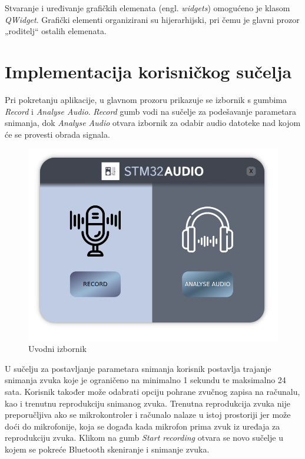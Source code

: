 Stvaranje i uređivanje grafičkih elemenata (engl. \textit{widgets}) omogućeno je klasom \textit{QWidget}. Grafički elementi organizirani su hijerarhijski, pri čemu je glavni prozor  „roditelj“ ostalih elemenata. 

\section{Implementacija korisničkog sučelja}

Pri pokretanju aplikacije, u glavnom prozoru prikazuje se izbornik s gumbima \textit{Record} i \textit{Analyse Audio}. \textit{Record} gumb vodi na sučelje za podešavanje parametara snimanja, dok \textit{Analyse Audio} otvara izbornik za odabir audio datoteke nad kojom će se provesti obrada signala.

\begin{figure}[ht]
	\includegraphics[width=\linewidth]{imgs/intro_form}
	\caption{Uvodni izbornik}
	\label{fig:intro_form}
\end{figure}


U sučelju za postavljanje parametara snimanja korisnik postavlja trajanje snimanja zvuka koje je ograničeno na minimalno 1 sekundu te maksimalno 24 sata. Korisnik također može odabrati opciju pohrane zvučnog zapisa na računalu, kao i trenutnu reprodukciju snimanog zvuka. Trenutna reprodukcija zvuka nije preporučljiva ako se mikrokontroler i računalo nalaze u istoj prostoriji jer može doći do mikrofonije, koja se događa kada mikrofon prima zvuk iz uređaja za reprodukciju zvuka. Klikom na gumb \textit{Start recording} otvara se novo sučelje u kojem se pokreće Bluetooth skeniranje i snimanje zvuka.

